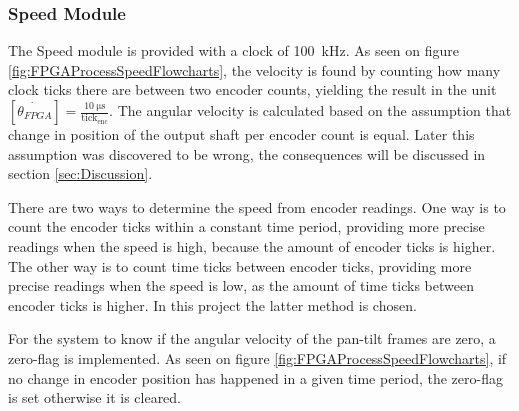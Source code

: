 \documentclass[../../main.tex]{subfiles}
\begin{document}
\subsubsection*{Speed Module}

The Speed module is provided with a clock of \SI{100}{\kilo \hertz}. As seen on figure \ref{fig:FPGAProcessSpeedFlowcharts}, the velocity is found by counting how many clock ticks there are between two encoder counts, yielding the result in the unit $\left[\dot{\theta_{FPGA}}\right] = \frac{\SI{10}{\micro \second}}{\mathrm{tick_{enc}}}$. The angular velocity is calculated based on the assumption that change in position of the output shaft per encoder count is equal. Later this assumption was discovered to be wrong, the consequences will be discussed in section \ref{sec:Discussion}.


There are two ways to determine the speed from encoder readings. One way is to count the encoder ticks within a constant time period, providing more precise readings when the speed is high, because the amount of encoder ticks is higher. The other way is to count time ticks between encoder ticks, providing more precise readings when the speed is low, as the amount of time ticks between encoder ticks is higher. In this project the latter method is chosen.   

For the system to know if the angular velocity of the pan-tilt frames are zero, a zero-flag is implemented. As seen on figure \ref{fig:FPGAProcessSpeedFlowcharts}, if no change in encoder position has happened in a given time period, the zero-flag is set otherwise it is cleared.
\end{document}
